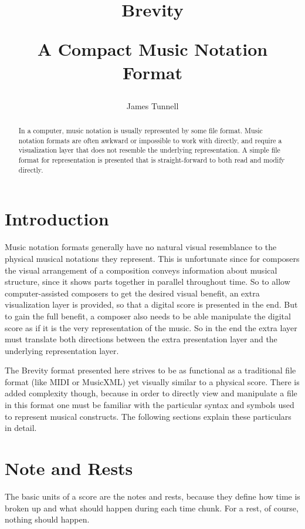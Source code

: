 \documentclass{scrartcl}
\begin{document}
\author{James Tunnell}
\title{Brevity\\
\begin{LARGE}
A Compact Music Notation Format
\end{LARGE}}
\maketitle

\begin{abstract}
In a computer, music notation is usually represented by some file format. Music notation formats are often awkward or impossible to work with directly, and require a visualization layer that does not resemble the underlying representation. A simple file format for representation is presented that is straight-forward to both read and modify directly.
\end{abstract}

\tableofcontents

\section{Introduction}
Music notation formats generally have no natural visual resemblance to the physical musical notations they represent. This is unfortunate since for composers the visual arrangement of a composition conveys information about musical structure, since it shows parts together in parallel throughout time. So to allow computer-assisted composers to get the desired visual benefit, an extra visualization layer is provided, so that a digital score is presented in the end. But to gain the full benefit, a composer also needs to be able manipulate the digital score as if it is the very representation of the music. So in the end the extra layer must translate both directions between the extra presentation layer and the underlying representation layer.

The Brevity format presented here strives to be as functional as a traditional file format (like MIDI or MusicXML) yet visually similar to a physical score. There is added complexity though, because in order to directly view and manipulate a file in this format one must be familiar with the particular syntax and symbols used to represent musical constructs. The following sections explain these particulars in detail.

\section{Note and Rests}
The basic units of a score are the notes and rests, because they define how time is broken up and what should happen during each time chunk. For a rest, of course, nothing should happen. 
\end{document}
